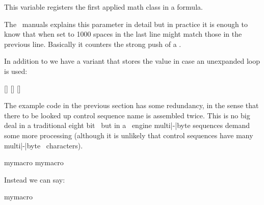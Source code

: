\startnewprimitive[title={\prm {lastleftclass}}]

This variable registers the first applied math class in a formula.

\stopnewprimitive


\startoldprimitive[title={\prm {lastlinefit}}]

The \ETEX\ manuals explains this parameter in detail but in practice it is enough
to know that when set to 1000 spaces in the last line might match those in the
previous line. Basically it counters the strong push of a .

\stopoldprimitive


\startnewprimitive[title={\prm {lastloopiterator}}]

In addition to  we have a variant that stores the value
in case an unexpanded loop is used:

\startbuffer
{} { [\the\currentloopiterator\eq\the\lastloopiterator] }
 { [\the\currentloopiterator\eq\the\lastloopiterator] }
 { [\the\currentloopiterator\ne\the\lastloopiterator] }
\stopbuffer

\typebuffer

\startlines
\getbuffer
\stoplines

\stopnewprimitive

\startnewprimitive[title={\prm {lastnamedcs}}]

The example code in the previous section has some redundancy, in the sense that
there to be looked up control sequence name  is assembled twice.
This is no big deal in a traditional eight bit \TEX\ but in a \UNICODE\ engine
multi|-|byte sequences demand some more processing (although it is unlikely that
control sequences have many multi|-|byte \ characters).

\starttyping
\ifcsname mymacro\endcsname
    \csname mymacro\endcsname
\fi
\stoptyping

Instead we can say:

\starttyping
\ifcsname mymacro\endcsname
    \lastnamedcs
\fi
\stoptyping

